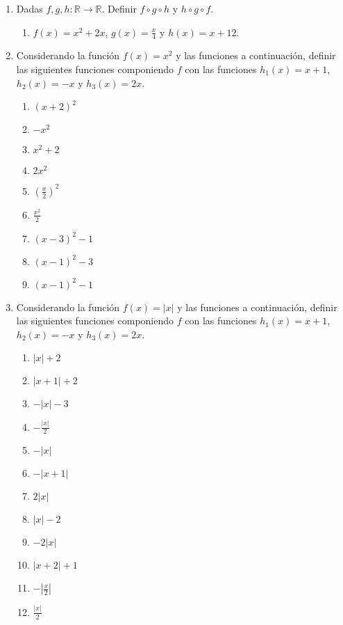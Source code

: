 \documentclass[a4paper]{article}
\newcommand{\exercise}{\item}
\begin{document}
\begin{enumerate}
\begin{enumerate} [label=(\alph*)]
	\end{enumerate}

	\exercise Dadas $f,g,h: \mathbb{R} \to \mathbb{R}$. Definir $f \circ g \circ h$ y $h \circ g \circ f$. 
	\begin{enumerate} [label=(\alph*)]
		\item $f(x)=x^2+2x$, $g(x)=\displaystyle\frac{x}{4}$ y $h(x)=x+12$.
	\end{enumerate}

	\exercise Considerando la función $f(x)=x^2$ y las funciones a continuación, definir las siguientes funciones componiendo $f$ con las funciones $h_1(x)=x+1$, $h_2(x)=-x$ y $h_3(x)=2x$.
	\begin{multicols}{3}
	\begin{enumerate} [label=(\alph*)]
		\item $(x+2)^2$
		\item $-x^2$
		\item $x^2+2$
		\item $2x^2$
		\item $\left(\displaystyle\frac{x}{2}\right)^2$
		\item $\displaystyle\frac{x^2}{2}$
		\item $(x-3)^2-1$
		\item $(x-1)^2-3$
		\item $(x-1)^2-1$
	\end{enumerate}
	\end{multicols}

	\exercise Considerando la función $f(x)=|x|$ y las funciones a continuación, definir las siguientes funciones componiendo $f$ con las funciones $h_1(x)=x+1$, $h_2(x)=-x$ y $h_3(x)=2x$.
	\begin{multicols}{3}
	\begin{enumerate} [label=(\alph*)]
		\item $|x|+2$
		\item $|x+1|+2$
		\item $-|x|-3$
		\item $-\displaystyle\frac{|x|}{2}$
		\item $-|x|$
		\item $-|x+1|$
		\item $2|x|$
		\item $|x|-2$
		\item $-2|x|$
		\item $|x+2|+1$
		\item $-\left|\displaystyle\frac{x}{2}\right|$
		\item $\displaystyle\frac{|x|}{2}$
	\end{enumerate}
	\end{multicols}


\end{enumerate}
\end{document}
